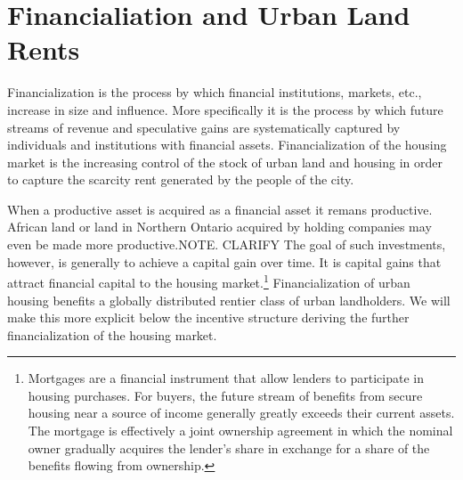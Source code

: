 %
%
%
%



\section{Financialiation and Urban Land Rents}

Financialization is the process by which financial institutions, markets, etc., increase in size and influence. More specifically it is the process by which future streams of revenue and speculative gains are systematically captured by individuals and institutions with financial assets. Financialization of the housing market is the increasing control of the stock of urban land and housing in order to capture the scarcity rent generated by the people of the city.  

When a productive asset is acquired as a financial asset it remans productive. African land or land in Northern Ontario acquired by holding companies may even be made more productive.NOTE. CLARIFY The goal of such investments, however, is generally to achieve a capital gain over time. It is capital gains that attract financial capital to the housing market.\footnote{Mortgages are a financial instrument that allow lenders to  participate in housing purchases.  For buyers, the future stream of benefits from secure housing near a source of income generally greatly exceeds their current assets. The mortgage is effectively a joint ownership agreement in which the nominal owner gradually acquires the lender's share in exchange for a  share of the benefits flowing from ownership.} 
 Financialization of urban housing benefits  a globally distributed rentier class of urban landholders. We will make this more explicit below the incentive structure deriving the further financialization of the housing market.

